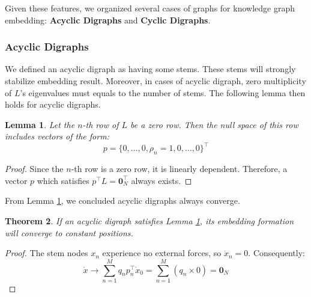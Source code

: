 \documentclass[letterpaper, 10 pt, conference]{ieeeconf}  %
\newtheorem{theorem}{Theorem}[section]
\newtheorem{lemma}[theorem]{Lemma}
\begin{document}
Given these features, we organized several cases of graphs for knowledge graph embedding: \textbf{Acyclic Digraphs} and \textbf{Cyclic Digraphs}.

\subsubsection{Acyclic Digraphs}

We defined an acyclic digraph as having some stems. These stems will strongly stabilize embedding result. Moreover, in cases of acyclic digraph, zero multiplicity of $L$'s eigenvalues must equals to the number of stems. The following lemma then holds for acyclic digraphs.

\begin{lemma}\label{lemma:p}
Let the \( n \)-th row of \( L \) be a zero row. Then the null space of this row includes vectors of the form:
\begin{equation}\label{eq:DAG_left}
    p = \{0, \dots, 0, \rho_n = 1, 0, \dots, 0\}^\top
\end{equation}
\end{lemma}

\begin{proof}
Since the \( n \)-th row is a zero row, it is linearly dependent. Therefore, a vector \( p \) which satisfies \( p^\top L = \mathbf{0}_N^\top \) always exists.
\end{proof}

From Lemma \ref{lemma:p}, we concluded acyclic digraphs always converge.

\begin{theorem}\label{th:DAG_converge}
If an acyclic digraph satisfies Lemma \ref{lemma:p}, its embedding formation will converge to constant positions.
\end{theorem}

\begin{proof}
The stem nodes \( x_n \) experience no external forces, so \( \dot{x}_n = 0 \). Consequently:
\begin{equation}\label{eq:0_N}
    \dot{x} \rightarrow \sum_{n=1}^M q_n p_n^\top \dot{x}_0 = \sum_{n=1}^M (q_n \times 0) = \mathbf{0}_N
\end{equation}
\end{proof}
\end{document}

